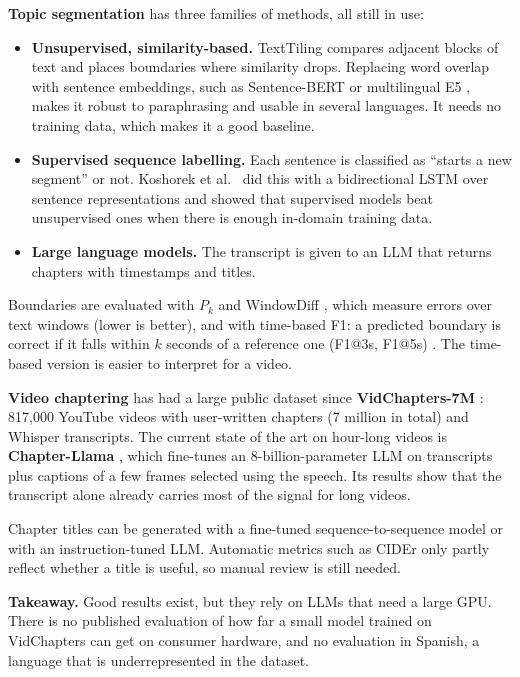 \documentclass[ENG]{TFUOC}
\begin{document}
\textbf{Topic segmentation} has three families of methods, all still in use:
\begin{itemize}
\item \textbf{Unsupervised, similarity-based.} TextTiling \cite{hearst1997texttiling} compares adjacent blocks of text and places boundaries where similarity drops. Replacing word overlap with sentence embeddings, such as Sentence-BERT \cite{reimers2019sbert} or multilingual E5 \cite{wang2024me5}, makes it robust to paraphrasing and usable in several languages. It needs no training data, which makes it a good baseline.
\item \textbf{Supervised sequence labelling.} Each sentence is classified as ``starts a new segment'' or not. Koshorek et al.\ \cite{koshorek2018textseg} did this with a bidirectional LSTM over sentence representations and showed that supervised models beat unsupervised ones when there is enough in-domain training data.
\item \textbf{Large language models.} The transcript is given to an LLM that returns chapters with timestamps and titles.
\end{itemize}

Boundaries are evaluated with $P_k$ \cite{beeferman1999pk} and WindowDiff \cite{pevzner2002windowdiff}, which measure errors over text windows (lower is better), and with time-based F1: a predicted boundary is correct if it falls within $k$ seconds of a reference one (F1@3s, F1@5s) \cite{ventura2025chapterllama}. The time-based version is easier to interpret for a video.

\textbf{Video chaptering} has had a large public dataset since \textbf{VidChapters-7M} \cite{yang2023vidchapters}: 817{,}000 YouTube videos with user-written chapters (7 million in total) and Whisper transcripts. The current state of the art on hour-long videos is \textbf{Chapter-Llama} \cite{ventura2025chapterllama}, which fine-tunes an 8-billion-parameter LLM on transcripts plus captions of a few frames selected using the speech. Its results show that the transcript alone already carries most of the signal for long videos.

Chapter titles can be generated with a fine-tuned sequence-to-sequence model or with an instruction-tuned LLM. Automatic metrics such as CIDEr only partly reflect whether a title is useful, so manual review is still needed.

\textbf{Takeaway.} Good results exist, but they rely on LLMs that need a large GPU. There is no published evaluation of how far a small model trained on VidChapters can get on consumer hardware, and no evaluation in Spanish, a language that is underrepresented in the dataset.
\end{document}
